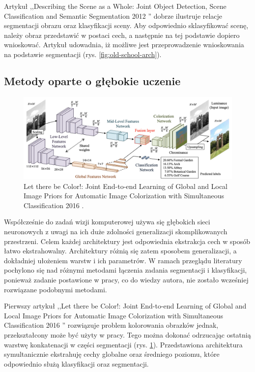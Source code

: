 Artykuł ,,Describing the Scene as a Whole: Joint Object Detection, Scene Classification and Semantic Segmentation 2012 \cite{yao2012describing}'' dobrze ilustruje relacje segmentacji obrazu oraz klasyfikacji sceny. Aby odpowiednio sklasyfikować scenę, należy obraz przedstawić w postaci cech, a następnie na tej podstawie dopiero wnioskować. Artykuł \cite{yao2012describing} udowadnia, iż możliwe jest przeprowadzenie wnioskowania na podstawie segmentacji (rys. \ref{fig:old-school-arch}).

\subsection{Metody oparte o głębokie uczenie}

\begin{figure}
    \includegraphics[width=\textwidth]{images/global-local-features.png}
    \caption{Let there be Color!: Joint End-to-end Learning of Global and Local Image Priors for Automatic Image Colorization with Simultaneous Classification 2016 \cite{iizuka2016let}.}
    \label{fig:parrarel-arch}
\end{figure}

Współcześnie do zadań wizji komputerowej używa się głębokich sieci neuronowych z uwagi na ich duże zdolności generalizacji skomplikowanych przestrzeni. Celem każdej architektury jest odpowiednia ekstrakcja cech w sposób łatwo ekstrahowalny. Architektury różnią się zatem sposobem generalizacji, a dokładniej ułożeniem warstw i ich parametrów. W ramach przeglądu literatury pochylono się nad różnymi metodami łączenia zadania segmentacji i klasyfikacji, ponieważ zadanie postawione w pracy, co do wiedzy autora, nie zostało wcześniej rozwiązane podobnymi metodami.

Pierwszy artykuł ,,Let there be Color!: Joint End-to-end Learning of Global and Local Image Priors for Automatic Image Colorization with Simultaneous Classification 2016 \cite{iizuka2016let}'' rozwiązuje problem kolorowania obrazków jednak, przekształcony może być użyty w pracy. Tego można dokonać odrzucając ostatnią warstwę konkatenacji w części segmentacji (rys. \ref{fig:parrarel-arch}). Przedstawiona architektura symultanicznie ekstrahuję cechy globalne oraz średniego poziomu, które odpowiednio służą klasyfikacji oraz segmentacji.

